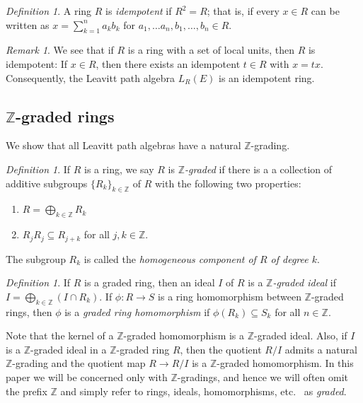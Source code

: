 \documentclass[11pt]{amsart}
\theoremstyle{remark}
\newtheorem{remark}[theorem]{Remark}
\newtheorem{definition}[theorem]{Definition}
\numberwithin{equation}{section}
\newcommand{\Z}{\mathbb{Z}}
\begin{document}
\begin{definition}
A ring $R$ is \emph{idempotent} if $R^2 = R$; that is, if every $x \in R$ can be written as $x = \sum_{k=1}^n a_k b_k$ for $a_1, \ldots a_n, b_1, \ldots, b_n \in R$.
\end{definition}

\begin{remark}
We see that if $R$ is a ring with a set of local units, then $R$ is idempotent:  If $x \in R$, then there exists an idempotent $t \in R$ with $x = tx$.  Consequently, the Leavitt path algebra $L_R(E)$ is an idempotent ring.
\end{remark}



\subsection{$\Z$-graded rings}

We show that all Leavitt  path algebras have a natural $\Z$-grading.  

\begin{definition}
If $R$ is a ring, we say $R$ is \emph{$\Z$-graded} if there is a a collection of additive subgroups $\{ R_k \}_{k \in \Z}$ of $R$ with the following two properties:
\begin{enumerate}
\item $R = \bigoplus_{k \in \Z} R_k$
\item $R_j R_j \subseteq R_{j+k}$ for all $j,k \in \Z$.
\end{enumerate}
The subgroup $R_k$ is called the \emph{homogeneous component of $R$ of degree $k$}.
\end{definition}

\begin{definition}
If $R$ is a graded ring, then an ideal $I$ of $R$ is a \emph{$\Z$-graded ideal} if $I = \bigoplus_{k \in \Z} (I \cap R_k)$.  If $\phi : R \to S$ is a ring homomorphism between $\Z$-graded rings, then $\phi$ is a \emph{graded ring homomorphism} if $\phi(R_k) \subseteq S_k$ for all $n \in \Z$.
\end{definition}

Note that the kernel of a $\Z$-graded homomorphism is a $\Z$-graded ideal.  Also, if $I$ is a $\Z$-graded ideal in a $\Z$-graded ring $R$, then the quotient $R / I$ admits a natural $\Z$-grading and the quotient map $R \to R /I$ is a $\Z$-graded homomorphism.  In this paper we will be concerned only with $\Z$-gradings, and hence we will often omit the prefix $\Z$ and simply refer to rings, ideals, homomorphisms, etc. ~as \emph{graded}. 
\end{document}
